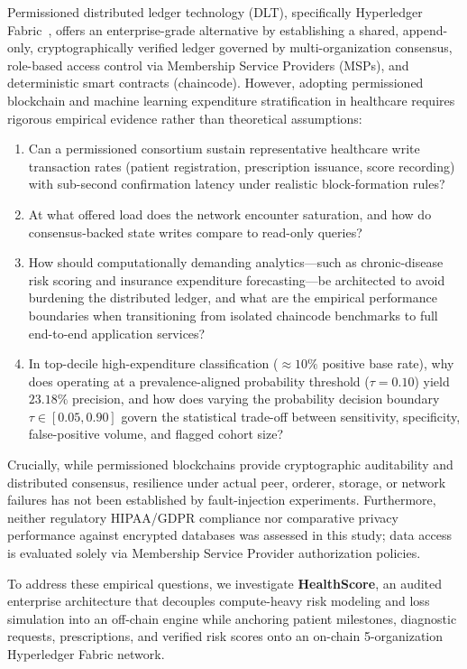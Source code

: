\documentclass[runningheads]{llncs}
\begin{document}
Permissioned distributed ledger technology (DLT), specifically Hyperledger Fabric~\cite{androulaki2018hyperledger}, offers an enterprise-grade alternative by establishing a shared, append-only, cryptographically verified ledger governed by multi-organization consensus, role-based access control via Membership Service Providers (MSPs), and deterministic smart contracts (chaincode). However, adopting permissioned blockchain and machine learning expenditure stratification in healthcare requires rigorous empirical evidence rather than theoretical assumptions:
\begin{enumerate}
    \item Can a permissioned consortium sustain representative healthcare write transaction rates (patient registration, prescription issuance, score recording) with sub-second confirmation latency under realistic block-formation rules?
    \item At what offered load does the network encounter saturation, and how do consensus-backed state writes compare to read-only queries?
    \item How should computationally demanding analytics---such as chronic-disease risk scoring and insurance expenditure forecasting---be architected to avoid burdening the distributed ledger, and what are the empirical performance boundaries when transitioning from isolated chaincode benchmarks to full end-to-end application services?
    \item In top-decile high-expenditure classification ($\approx 10\%$ positive base rate), why does operating at a prevalence-aligned probability threshold ($\tau = 0.10$) yield $23.18\%$ precision, and how does varying the probability decision boundary $\tau \in [0.05, 0.90]$ govern the statistical trade-off between sensitivity, specificity, false-positive volume, and flagged cohort size?
\end{enumerate}

Crucially, while permissioned blockchains provide cryptographic auditability and distributed consensus, resilience under actual peer, orderer, storage, or network failures has not been established by fault-injection experiments. Furthermore, neither regulatory HIPAA/GDPR compliance nor comparative privacy performance against encrypted databases was assessed in this study; data access is evaluated solely via Membership Service Provider authorization policies.

To address these empirical questions, we investigate \textbf{HealthScore}, an audited enterprise architecture that decouples compute-heavy risk modeling and loss simulation into an off-chain engine while anchoring patient milestones, diagnostic requests, prescriptions, and verified risk scores onto an on-chain 5-organization Hyperledger Fabric network.
\end{document}
